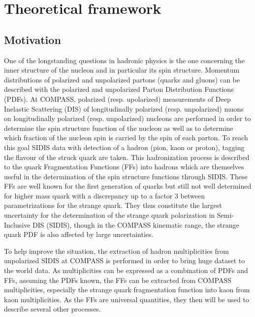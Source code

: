 
\chapter{Theoretical framework} %

\label{ch:thfw} %


\section{Motivation}

One of the longstanding questions in hadronic physics is the one concerning the inner structure of the nucleon and in particular its spin structure. Momentum distributions of polarized and unpolarized partons (quarks and gluons) can be described with the polarized and unpolarized Parton Distribution Functions (PDFs). At COMPASS, polarized (resp. upolarized) measurements of Deep Inelastic Scattering (DIS) of longitudinally polarized (resp. unpolarized) muons on longitudinally polarized (resp. unpolarized) nucleons are performed in order to determine the spin structure function of the nucleon as well as to determine which fraction of the nucleon spin is carried by the spin of each parton. To reach this goal SIDIS data with detection of a hadron (pion, kaon or proton), tagging the flavour of the struck quark are taken. This hadronization process is described to the quark Fragmentation Functions (FFs) into hadrons which are themselves useful in the determination of the spin structure functions through SIDIS. These FFs are well known for the first generation of quarks but still not well determined for higher mass quark with a discrepancy up to a factor 3 between parametrizations for the strange quark. They thus constitute the largest uncertainty for the determination of the strange quark polarization in Semi-Inclusive DIS (SIDIS), though in the COMPASS kinematic range, the strange quark PDF is also affected by large uncertainties.

To help improve the situation, the extraction of hadron multiplicities from unpolarized SIDIS at COMPASS is performed in order to bring huge dataset to the world data. As multiplicities can be expressed as a combination of PDFs and FFs, assuming the PDFs known, the FFs can be extracted from COMPASS multiplicities, especially the strange quark fragmentation function into kaon from kaon multiplicities. As the FFs are universal quantities, they then will be used to describe several other processes.

